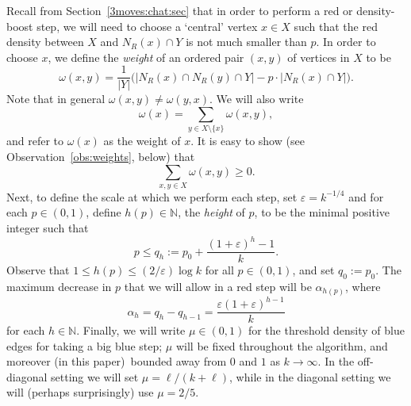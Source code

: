 \documentclass[12pt,reqno]{amsart}
\theoremstyle{definition}
\newtheorem{defn}[theorem]{Definition}
\theoremstyle{remark}
\newcommand\N{\mathbb{N}}
\newcommand\eps{\varepsilon}
\renewcommand{\le}{\leqslant}
\renewcommand{\ge}{\geqslant}
\renewcommand{\to}{\rightarrow}
\def\eps{\varepsilon}
\def\N{\mathbb{N}}
\begin{document}
Recall from Section~\ref{3moves:chat:sec} that in order to perform a red or density-boost step, we will need to choose a `central' vertex $x \in X$ such that the red density between $X$ and $N_R(x) \cap Y$ is not much smaller than $p$. In order to choose $x$, we define the \emph{weight} of an ordered pair $(x,y)$ of vertices in $X$ to be 
\begin{equation}\label{def:weight}
\omega(x,y) = \frac{1}{|Y|} \Big( |N_R(x) \cap N_R(y) \cap Y|  - p \cdot |N_R(x) \cap Y| \Big).
\end{equation}
Note that in general $\omega(x,y) \ne \omega(y,x)$. %
We will also write 
\begin{equation}\label{def:vtx:weight}
\omega(x) = \sum_{y \in X \setminus \{x\}} \omega(x,y),
\end{equation}
and refer to $\omega(x)$ as the weight of $x$. It is easy to show (see Observation~\ref{obs:weights}, below) that 
$$\sum_{x,y \in X} \omega(x,y) \ge 0.$$
Next, to define the scale at which we perform each step, set $\eps = k^{-1/4}$ and for each $p \in (0,1)$, define $h(p) \in \N$, the \emph{height} of $p$, to be the minimal positive integer such that 
\begin{equation}\label{def:height}
p \le q_h := p_0 + \frac{(1+\eps)^h - 1}{k}.
\end{equation}
Observe that $1 \le h(p) \le (2/\eps) \log k$ for all $p \in (0,1)$, and set $q_0 := p_0$. %
The maximum decrease in $p$ that we will allow in a red step will be $\alpha_{h(p)}$, where 
\begin{equation}\label{def:alpha}
\alpha_h = q_h - q_{h-1} = \frac{\eps(1+\eps)^{h-1}}{k}
\end{equation}
for each $h \in \N$. Finally, we will write $\mu \in (0,1)$ for the threshold density of blue edges for taking a big blue step; $\mu$ will be fixed throughout the algorithm, and moreover (in this paper)~bounded away from $0$ and $1$ as $k \to \infty$. In the off-diagonal setting we will set $\mu = \ell / (k + \ell)$, while in the diagonal setting we will (perhaps surprisingly) use $\mu = 2/5$. 

\end{document}
